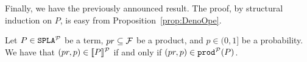 Finally, we have the previously announced result. The proof, by structural induction on $P$, is easy from
Proposition~\ref{prop:DenoOpe}.


\bthm\label{prop:equivprob}
  Let $P\in\mathtt{SPLA{^{\cal P}}}$ be a term, $pr\subseteq{\cal F}$ be a product, and
  $p\in(0,1]$ be a probability. We have that $ (pr,p)\in[\![P]\!]^{\cal P}$ if and only if
  $(pr,p)\in\mathtt{prod}^{\cal P}(P)$.
\ethm



